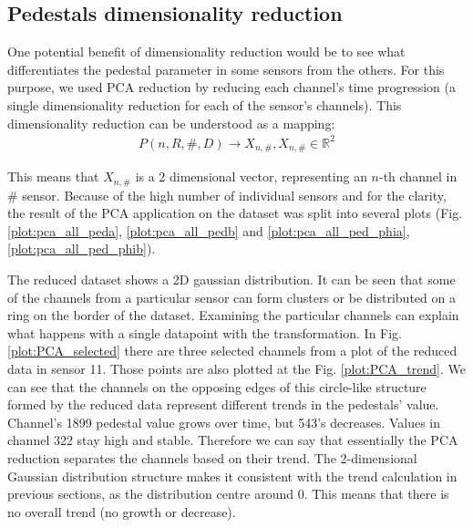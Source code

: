 \subsection{Pedestals dimensionality reduction}

One potential benefit of dimensionality reduction would be to see what differentiates the pedestal parameter in some sensors from the others. For this purpose, we used PCA reduction by reducing each channel's time progression (a single dimensionality reduction for each of the sensor's channels).
This dimensionality reduction can be understood as a mapping:
\begin{align}
  P(n, R, \#, D) \rightarrow X_{n,\#}, X_{n,\#} \in \mathbb{R}^{2}
\end{align}

This means that $X_{n,\#}$ is a 2 dimensional vector, representing an $n$-th channel in $\#$ sensor. 
 Because of the high number of individual sensors and for the clarity, the result of the PCA application on the dataset was split into several plots (Fig. \ref{plot:pca_all_peda}, \ref{plot:pca_all_pedb} and \ref{plot:pca_all_ped_phia}, \ref{plot:pca_all_ped_phib}).

  The reduced dataset shows a 2D gaussian distribution.
  It can be seen that some of the channels from a particular sensor can form clusters or be distributed on a ring on the border of the dataset.
  Examining the particular channels can explain what happens with a single datapoint with the transformation.
  In Fig. \ref{plot:PCA_selected} there are three selected channels from a plot of the reduced data in sensor 11.
  Those points are also plotted at the Fig. \ref{plot:PCA_trend}.
  We can see that the channels on the opposing edges of this circle-like structure formed by the reduced data represent different trends in the pedestals' value.
  Channel's 1899 pedestal value grows over time, but 543's decreases.
  Values in channel 322 stay high and stable.
  Therefore we can say that essentially the PCA reduction separates the channels based on their trend.
  The 2-dimensional Gaussian distribution structure makes it consistent with the trend calculation in previous sections, as the distribution centre around 0.
  This means that there is no overall trend (no growth or decrease).
  
